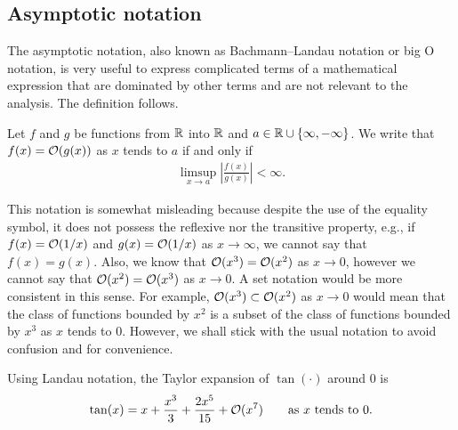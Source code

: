 \subsection{Asymptotic notation}

The asymptotic notation, also known as Bachmann--Landau notation or big O notation, is very useful to express complicated terms of a mathematical expression that are dominated by other terms and are not relevant to the analysis.
%
The definition follows.

\begin{definition} \label{def:landau}
    Let $f$ and $g$ be functions from $\R$ into $\R$ and $a\in\R\cup\{\infty,-\infty\}$.
    We write that $f(x) = \cal{O}(g(x))$ as $x$ tends to $a$ if and only if
    \begin{align*}
        \limsup_{x\to a} \left| \frac{f(x)}{g(x)} \right| < \infty.
    \end{align*}
    
\end{definition}

This notation is somewhat misleading because despite the use of the equality symbol, it does not possess the reflexive nor the transitive property, e.g.,
%
if $f(x)=\cal{O}(1/x)$ and $g(x)=\cal{O}(1/x)$ as $x\to\infty$, we cannot say that $f(x) = g(x)$.
%
Also, we know that $\cal{O}(x^3) = \cal{O}(x^2)$ as $x\to0$, however we cannot say that $\cal{O}(x^2) = \cal{O}(x^3)$ as $x\to0$.
%
A set notation would be more consistent in this sense. For example, $\cal{O}(x^3) \subset \cal{O}(x^2)$ as $x\to0$ would mean that the class of functions bounded by $x^2$ is a subset of the class of functions bounded by $x^3$ as $x$ tends to $0$.
%
However, we shall stick with the usual notation to avoid confusion and for convenience.

\begin{example} Using Landau notation, the Taylor expansion of $\tan(\cdot)$ around $0$ is
    \begin{align*} 
        \tan(x) = x + \frac{x^3}{3} + \frac{2x^5}{15} + \cal{O}(x^7)\qquad \text{as $x$ tends to $0$}.
    \end{align*}
\end{example}




